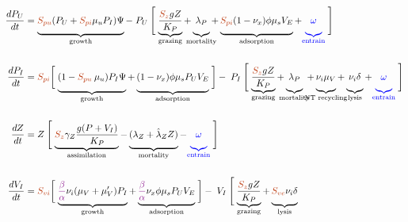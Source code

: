 \documentclass{article}
\begin{document}
\begin{align}
    \frac{dP_U}{dt} &= \underbrace{\vphantom{\frac{{\color{Bittersweet} S_{z}} g Z}{K_P}} {\color{Bittersweet} S_{pu}} (P_U + {\color{Bittersweet} S_{pi}} \mu_u P_I) \Psi}_{\textrm{growth}} 
    -  \; P_U \: \Biggl[ \;\underbrace{\frac{{\color{Bittersweet} S_{z}} g Z}{K_P}}_{\mathclap{\textrm{grazing}}} 
    + \underbrace{\vphantom{\frac{g Z}{K_P}} \lambda_P}_{\mathclap{\textrm{mortality}}} 
    + \underbrace{\vphantom{\frac{g Z}{K_P}} {\color{Bittersweet} S_{pi}} (1 - \nu_x) \phi \mu_s V_E }_{\textrm{adsorption}}
    + {\color{blue} \underbrace{\vphantom{\frac{g Z}{K_P}} \omega}_{\textrm{entrain}}} \;\Biggr] \\[15pt]
    \frac{dP_I}{dt} &= {\color{Bittersweet} S_{pi}} \biggl[ \; \underbrace{  (1 - {\color{Bittersweet} S_{pu}} \: \mu_u) P_I \Psi \biggr. }_{\textrm{growth}} 
    + \underbrace{ \biggl. (1 - \nu_x) \phi \mu_s P_U V_E }_{\textrm{adsorption}} \; \biggr]
    - \; P_I \: \Biggl[\; \underbrace{\vphantom{\frac{{\color{Bittersweet} S_{z}} g Z}{K_P}} \frac{{\color{Bittersweet} S_{z}} g Z}{K_P}}_{\mathclap{\textrm{grazing}}} 
    + \underbrace{\vphantom{\frac{g Z}{K_P}} \lambda_P}_{\mathclap{\textrm{mortality}}} \;
    + \underbrace{\vphantom{\frac{g Z}{K_P}} \nu_{i}  \mu_V}_{\mathclap{\textrm{NT recycling}}} 
    + \underbrace{\vphantom{\frac{g Z}{K_P}} \nu_i \delta}_{\textrm{lysis}} 
    + {\color{blue}\underbrace{\vphantom{\frac{g Z}{K_P}} \omega}_{\textrm{entrain}}} \; \Biggr] \\[15pt]
    \frac{dZ}{dt} &= Z \: \Biggl[\; \underbrace{{\color{Bittersweet} S_{z}} \gamma_Z \frac{g (P+V_I)}{K_P} }_{\textrm{assimilation}} 
    - \underbrace{\vphantom{\gamma_Z \frac{g (P+V_I)}{K_P}} (\lambda_Z + \hat{\lambda}_Z Z)}_{\textrm{mortality}} 
    - {\color{blue}\underbrace{\vphantom{\gamma_Z \frac{g (P+V_I)}{K_P}} \omega}_{\textrm{entrain}}} \;\Biggr]\\[15pt]
    \frac{dV_I}{dt} &= {\color{Bittersweet} S_{vi}} \biggl[\; \underbrace{\vphantom{\frac{g Z}{K_P}} \textcolor{Plum}{\frac{\beta}{\alpha}} \nu_{i} ( \mu_V + \mu_V' ) P_I}_{\textrm{growth}} + \underbrace{\vphantom{\frac{g Z}{K_P}} \textcolor{Plum}{\frac{\beta}{\alpha}} \nu_x \phi \mu_s P_U V_E}_{\textrm{adsorption}} \;\biggr]
    - \; V_I \: \Biggl[\; \underbrace{\frac{{\color{Bittersweet} S_{z}} g Z}{K_P}}_{\textrm{grazing}} 
    + \underbrace{\vphantom{\frac{g Z}{K_P}}  {\color{Bittersweet} S_{ve}} \nu_i \delta }_{\textrm{lysis}}

\end{align}
\end{document}
